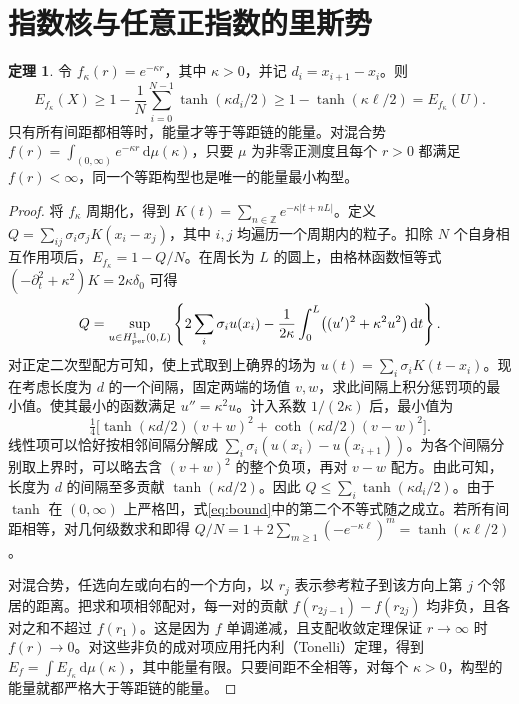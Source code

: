 \documentclass[11pt]{article}
\theoremstyle{definition}
\newtheorem{theorem}{定理}
\newcommand{\Z}{\mathbb Z}
\newcommand{\dd}{\,\mathrm d}
\begin{document}
\section{指数核与任意正指数的里斯势}
\begin{theorem}\label{thm:exp}
令 $f_\kappa(r)=e^{-\kappa r}$，其中 $\kappa>0$，并记 $d_i=x_{i+1}-x_i$。则
\begin{equation}\label{eq:bound}
 E_{f_\kappa}(X)\ge1-\frac1N\sum_{i=0}^{N-1}
         \tanh(\kappa d_i/2)\ge1-\tanh(\kappa\ell/2)
         =E_{f_\kappa}(U).
\end{equation}
只有所有间距都相等时，能量才等于等距链的能量。对混合势 $f(r)=\int_{(0,\infty)}e^{-\kappa r}\dd\mu(\kappa)$，只要 $\mu$ 为非零正测度且每个 $r>0$ 都满足 $f(r)<\infty$，同一个等距构型也是唯一的能量最小构型。
\end{theorem}
\begin{proof}
将 $f_\kappa$ 周期化，得到 $K(t)=\sum_{n\in\Z}e^{-\kappa|t+nL|}$。定义
$Q=\sum_{ij}\sigma_i\sigma_j K(x_i-x_j)$，其中 $i,j$ 均遍历一个周期内的粒子。扣除 $N$ 个自身相互作用项后，$E_{f_\kappa}=1-Q/N$。在周长为 $L$ 的圆上，由格林函数恒等式 $(-\partial_t^2+\kappa^2)K=2\kappa\delta_0$ 可得
\[
 Q=\sup_{u\in H^1_{\rm per}(0,L)}
   \left\{2\sum_i\sigma_i u(x_i)-
    \frac1{2\kappa}\int_0^L\bigl((u')^2+\kappa^2 u^2\bigr)\dd t\right\}.
\]
对正定二次型配方可知，使上式取到上确界的场为 $u(t)=\sum_i\sigma_i K(t-x_i)$。现在考虑长度为 $d$ 的一个间隔，固定两端的场值 $v,w$，求此间隔上积分惩罚项的最小值。使其最小的函数满足 $u''=\kappa^2u$。计入系数 $1/(2\kappa)$ 后，最小值为
\[
 \tfrac14\bigl[\tanh(\kappa d/2)(v+w)^2+
             \coth(\kappa d/2)(v-w)^2\bigr].
\]
线性项可以恰好按相邻间隔分解成 $\sum_i\sigma_i(u(x_i)-u(x_{i+1}))$。为各个间隔分别取上界时，可以略去含 $(v+w)^2$ 的整个负项，再对 $v-w$ 配方。由此可知，长度为 $d$ 的间隔至多贡献 $\tanh(\kappa d/2)$。因此 $Q\le\sum_i\tanh(\kappa d_i/2)$。由于 $\tanh$ 在 $(0,\infty)$ 上严格凹，式\eqref{eq:bound}中的第二个不等式随之成立。若所有间距相等，对几何级数求和即得 $Q/N=1+2\sum_{m\ge1}(-e^{-\kappa\ell})^m=\tanh(\kappa\ell/2)$。

对混合势，任选向左或向右的一个方向，以 $r_j$ 表示参考粒子到该方向上第 $j$ 个邻居的距离。把求和项相邻配对，每一对的贡献 $f(r_{2j-1})-f(r_{2j})$ 均非负，且各对之和不超过 $f(r_1)$。这是因为 $f$ 单调递减，且支配收敛定理保证 $r\to\infty$ 时 $f(r)\to0$。对这些非负的成对项应用托内利（Tonelli）定理，得到 $E_f=\int E_{f_\kappa}\dd\mu(\kappa)$，其中能量有限。只要间距不全相等，对每个 $\kappa>0$，构型的能量就都严格大于等距链的能量。
\end{proof}
\end{document}
